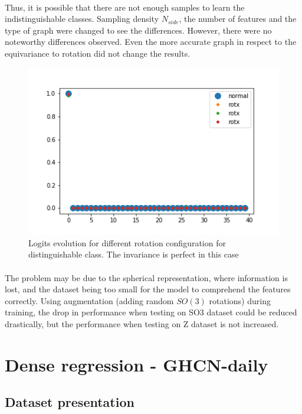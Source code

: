 \documentclass[11pt]{report}
\begin{document}
\paragraph*{}
Thus, it is possible that there are not enough samples to learn the indistinguishable classes. Sampling density $N_{side}$, the number of features and the type of graph were changed to see the differences. However, there were no noteworthy differences observed. Even the more accurate graph in respect to the equivariance to rotation did not change the results.


\begin{figure}[!ht]
    \centering
    \includegraphics[width=0.7\linewidth]{figures/logits_change_airplane.png}
    \caption{Logits evolution for different rotation configuration for distinguishable class. The invariance is perfect in this case}
    \label{fig:mn40_logits_airplane}
\end{figure}

\paragraph*{}
The problem may be due to the spherical representation, where information is lost, and the dataset being too small for the model to comprehend the features correctly.
Using augmentation (adding random $SO(3)$ rotations) during training, the drop in performance when testing on SO3 dataset could be reduced drastically, but the performance when testing on Z dataset is not increased.

\section{Dense regression - GHCN-daily}\label{task:GHCN}
\subsection{Dataset presentation}
\end{document}
